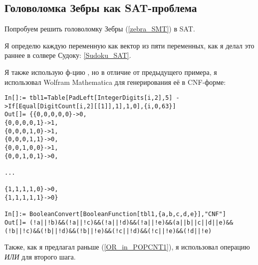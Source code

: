 \subsection{Головоломка Зебры как SAT-проблема}
\label{Zebra_SAT}

Попробуем решить головоломку Зебры (\ref{zebra_SMT}) в SAT.

Я определю каждую переменную как вектор из пяти переменных, как я делал это раннее в солвере Судоку: \ref{Sudoku_SAT}.

Я также использую ф-цию , но в отличие от предыдущего примера,
я использовал Wolfram Mathematica для генерирования её в CNF-форме:

\begin{lstlisting}
In[]:= tbl1=Table[PadLeft[IntegerDigits[i,2],5] ->If[Equal[DigitCount[i,2][[1]],1],1,0],{i,0,63}]
Out[]= {{0,0,0,0,0}->0,
{0,0,0,0,1}->1,
{0,0,0,1,0}->1,
{0,0,0,1,1}->0,
{0,0,1,0,0}->1,
{0,0,1,0,1}->0,

...

{1,1,1,1,0}->0,
{1,1,1,1,1}->0}

In[]:= BooleanConvert[BooleanFunction[tbl1,{a,b,c,d,e}],"CNF"]
Out[]= (!a||!b)&&(!a||!c)&&(!a||!d)&&(!a||!e)&&(a||b||c||d||e)&&(!b||!c)&&(!b||!d)&&(!b||!e)&&(!c||!d)&&(!c||!e)&&(!d||!e)
\end{lstlisting}

Также, как я предлагал раньше (\ref{OR_in_POPCNT1}), я использовал операцию \textit{ИЛИ} для второго шага.


